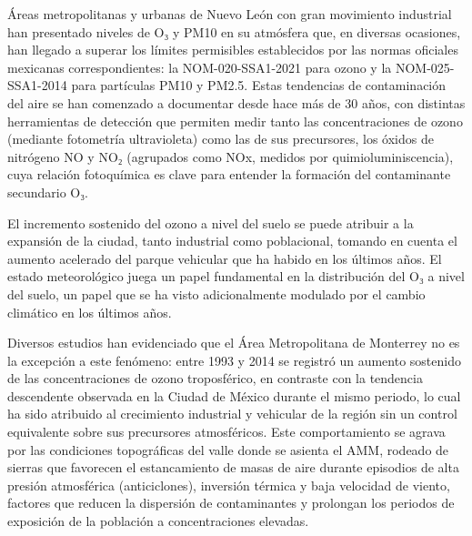 
Áreas metropolitanas y urbanas de Nuevo León con gran movimiento industrial han presentado niveles de O₃ y PM10 en su atmósfera que, en diversas ocasiones, han llegado a superar los límites permisibles establecidos por las normas oficiales mexicanas correspondientes: la NOM-020-SSA1-2021 para ozono y la NOM-025-SSA1-2014 para partículas PM10 y PM2.5. Estas tendencias de contaminación del aire se han comenzado a documentar desde hace más de 30 años, con distintas herramientas de detección que permiten medir tanto las concentraciones de ozono (mediante fotometría ultravioleta) como las de sus precursores, los óxidos de nitrógeno NO y NO₂ (agrupados como NOx, medidos por quimioluminiscencia), cuya relación fotoquímica es clave para entender la formación del contaminante secundario O₃.

El incremento sostenido del ozono a nivel del suelo se puede atribuir a la expansión de la ciudad, tanto industrial como poblacional, tomando en cuenta el aumento acelerado del parque vehicular que ha habido en los últimos años. El estado meteorológico juega un papel fundamental en la distribución del O₃ a nivel del suelo, un papel que se ha visto adicionalmente modulado por el cambio climático en los últimos años.

Diversos estudios han evidenciado que el Área Metropolitana de Monterrey no es la excepción a este fenómeno: entre 1993 y 2014 se registró un aumento sostenido de las concentraciones de ozono troposférico, en contraste con la tendencia descendente observada en la Ciudad de México durante el mismo periodo, lo cual ha sido atribuido al crecimiento industrial y vehicular de la región sin un control equivalente sobre sus precursores atmosféricos. Este comportamiento se agrava por las condiciones topográficas del valle donde se asienta el AMM, rodeado de sierras que favorecen el estancamiento de masas de aire durante episodios de alta presión atmosférica (anticiclones), inversión térmica y baja velocidad de viento, factores que reducen la dispersión de contaminantes y prolongan los periodos de exposición de la población a concentraciones elevadas. 

